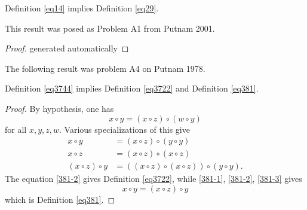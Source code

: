 \begin{theorem}[14 implies 29]\label{14_implies_29} \leanok  Definition \ref{eq14} implies Definition \ref{eq29}.
\end{theorem}

This result was posed as Problem A1 from Putnam 2001.

\begin{proof}\leanok
generated automatically
\end{proof}



The following result was problem A4 on Putnam 1978.

\begin{theorem}[3744 implies 3722, 381]\label{3744_implies_3722_381} Definition \ref{eq3744} implies Definition \ref{eq3722} and Definition \ref{eq381}.
\end{theorem}

\begin{proof} By hypothesis, one has
$$x \circ y = (x \circ z) \circ (w \circ y)
  $$
for all $x,y,z,w$.  Various specializations of this give
\begin{align}
 x \circ y &= (x \circ z) \circ (y \circ y) \label{381-1} \\
 x \circ z &= (x \circ z) \circ (x \circ z) \label{381-2} \\
(x \circ z) \circ y &= ((x \circ z) \circ (x \circ z)) \circ (y \circ y) \label{381-3}.
\end{align}
The equation \eqref{381-2} gives Definition \ref{eq3722}, while \eqref{381-1}, \eqref{381-2}, \eqref{381-3} gives
$$ x \circ y = (x\circ z) \circ y$$
which is Definition \ref{eq381}.
\end{proof}
